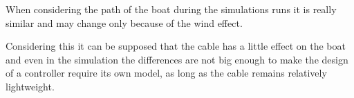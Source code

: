 When considering the path of the boat during the simulations runs it is really similar and may change only because of the wind effect.

Considering this it can be supposed that the cable has a little effect on the boat and even in the simulation the differences are not big enough to make the design of a controller require its own model, as long as the cable remains relatively lightweight.
	



 
